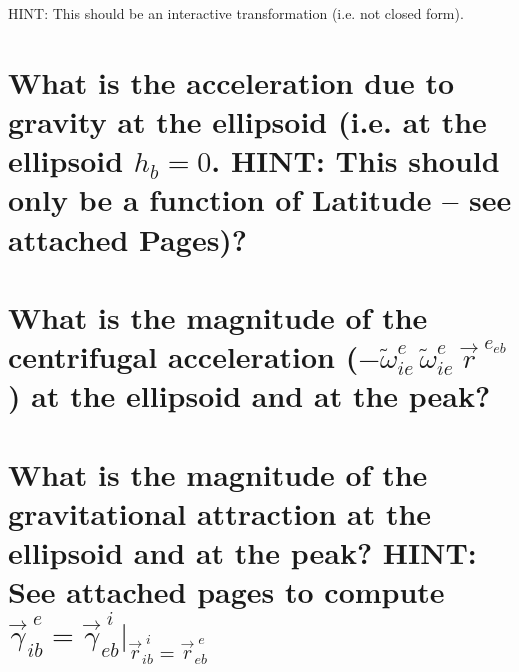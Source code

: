 \documentclass[12pt,letterpaper, onecolumn]{exam}
\begin{document}
\begin{questions}
\begin{parts}
{            HINT: This should be an interactive transformation (i.e. not closed form).}

        \part{What is the acceleration due to gravity at the ellipsoid (i.e. at the ellipsoid $h_b = 0$. HINT: This should only be a function of Latitude -- see attached Pages)?}

        \part{What is the magnitude of the centrifugal acceleration ($-\tilde{\omega}^{e}_{ie}\,\tilde{\omega}^{e}_{ie}\,\vec{r}^{\;e_{eb}}$) at the ellipsoid and at the peak?}

        \part{What is the magnitude of the gravitational attraction at the ellipsoid and at the peak? HINT: See \textbf{attached pages} to compute $\vec{\gamma}^{\;e}_{ib} = \vec{\gamma}^{\;i}_{eb} \vert_{\vec{r}^{\;i}_{ib} = \vec{r}^{\;e}_{eb}}$}
    \end{parts}
\end{questions}


\end{document}
